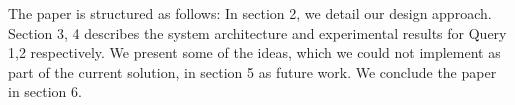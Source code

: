 
The paper is structured as follows: In section 2, we detail our design approach. Section 3, 4 describes the system architecture and experimental results for Query 1,2 respectively. We present some of the ideas, which we could not implement as part of the current solution, in section 5 as future work. We conclude the paper in section 6.

